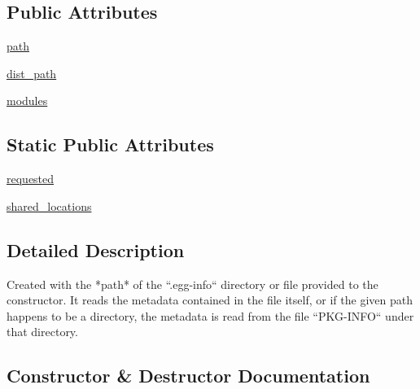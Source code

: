 \subsection*{Public Attributes}
\begin{DoxyCompactItemize}
\item 
\hyperlink{classpip_1_1__vendor_1_1distlib_1_1database_1_1EggInfoDistribution_ab072a8f377ba687962b592a5e3d3b25c}{path}
\item 
\hyperlink{classpip_1_1__vendor_1_1distlib_1_1database_1_1EggInfoDistribution_affeafc4a0d28336c2e77b157e2e156d2}{dist\+\_\+path}
\item 
\hyperlink{classpip_1_1__vendor_1_1distlib_1_1database_1_1EggInfoDistribution_ab07d9ff7e4d09b06fccde0d8fc43277f}{modules}
\end{DoxyCompactItemize}
\subsection*{Static Public Attributes}
\begin{DoxyCompactItemize}
\item 
\hyperlink{classpip_1_1__vendor_1_1distlib_1_1database_1_1EggInfoDistribution_a551987cd32f61827a0db46ced16057b5}{requested}
\item 
\hyperlink{classpip_1_1__vendor_1_1distlib_1_1database_1_1EggInfoDistribution_af8db1124070166f3d33b99d1d1085147}{shared\+\_\+locations}
\end{DoxyCompactItemize}


\subsection{Detailed Description}
\begin{DoxyVerb}Created with the *path* of the ``.egg-info`` directory or file provided
to the constructor. It reads the metadata contained in the file itself, or
if the given path happens to be a directory, the metadata is read from the
file ``PKG-INFO`` under that directory.\end{DoxyVerb}
 

\subsection{Constructor \& Destructor Documentation}
\mbox{\label{classpip_1_1__vendor_1_1distlib_1_1database_1_1EggInfoDistribution_a3b17587547b5d4fb68128342686671b1}} 
